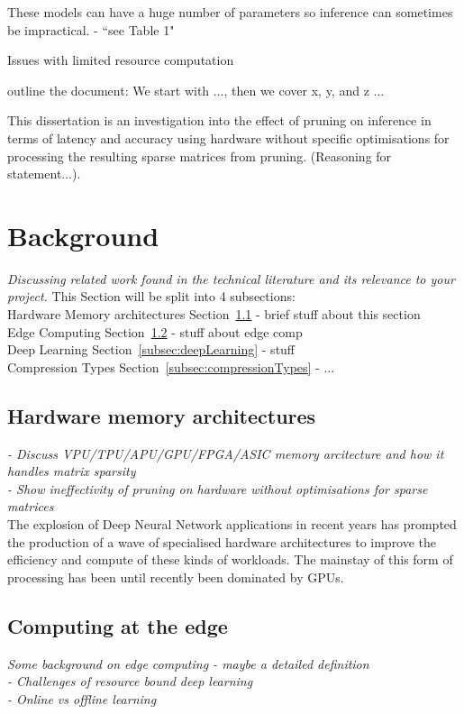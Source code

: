 \documentclass[11pt]{article}
\begin{document}
These models can have a huge number of parameters so inference can sometimes be impractical.
\autocite{chenDeepLearningMobile2020} - ``see Table 1"

Issues with limited resource computation \autocite{szeEfficientProcessingDeep2017}

outline the document: We start with ..., then we cover x, y, and z ...

This dissertation is an investigation into the effect of pruning on inference in terms of latency and accuracy using 
hardware without specific optimisations for processing the resulting sparse matrices from pruning. (Reasoning for statement...). 

\pagebreak
\section{Background}
\emph{Discussing related work found in the technical literature and its relevance to your
project.}
This Section will be split into 4 subsections:\\
Hardware Memory architectures Section~\ref{subsec:hardwareArch} - brief stuff about this section\\
Edge Computing Section~\ref{subsec:edgeComputing} - stuff about edge comp\\
Deep Learning Section~\ref{subsec:deepLearning} - stuff\\
Compression Types Section~\ref{subsec:compressionTypes} - ...\\


\subsection{Hardware memory architectures}\label{subsec:hardwareArch}
\emph{
- Discuss VPU/TPU/APU/GPU/FPGA/ASIC memory arcitecture and how it handles matrix sparsity\\
- Show ineffectivity of pruning on hardware without optimisations for sparse matrices\\
}
The explosion of Deep Neural Network applications in recent years has prompted the production of a wave of specialised hardware architectures to improve the efficiency and compute of these kinds of workloads. The mainstay of this form of processing has been until recently been dominated by GPUs.\\

\subsection{Computing at the edge}\label{subsec:edgeComputing}
\emph{Some background on edge computing - maybe a detailed definition\\
 - Challenges of resource bound deep learning\\
 - Online vs offline learning
 }
\end{document}
